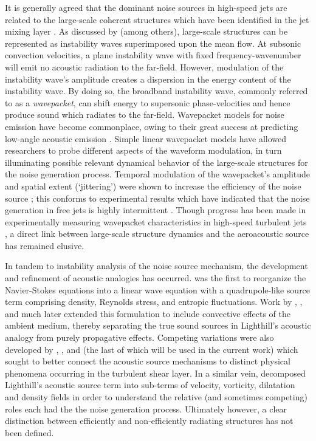 It is generally agreed that the dominant noise sources in high-speed jets are related to the large-scale coherent structures which have been identified in the jet mixing layer \citep{Arndt1997}. 
As discussed by \citet{Tam1995} (among others), large-scale structures can be represented as instability waves superimposed upon the mean flow.
At subsonic convection velocities, a plane instability wave with fixed frequency-wavenumber will emit no acoustic radiation to the far-field.
However, modulation of the instability wave's amplitude creates a dispersion in the energy content of the instability wave.
By doing so, the broadband instability wave, commonly referred to as a \emph{wavepacket}, can shift energy to supersonic phase-velocities and hence produce sound which radiates to the far-field.
Wavepacket models for noise emission have become commonplace, owing to their great success at predicting low-angle acoustic emission \citep{Obrist2011}.
Simple linear wavepacket models have allowed researchers to probe different aspects of the waveform modulation, in turn illuminating possible relevant dynamical behavior of the large-scale structures for the noise generation process.
Temporal modulation of the wavepacket's amplitude and spatial extent (`jittering') were shown to increase the efficiency of the noise source \citep{Cavalieri2010}; this conforms to experimental results which have indicated that the noise generation in free jets is highly intermittent \citep{Hileman2005,Kearney-Fischer2013}. 
Though progress has been made in experimentally measuring wavepacket characteristics in high-speed turbulent jets \citep{Cavalieri2013,Baqui2014}, a direct link between large-scale structure dynamics and the aeroacoustic source has remained elusive.

In tandem to instability analysis of the noise source mechanism, the development and refinement of acoustic analogies has occurred. 
\citet{Lighthill1952} was the first to reorganize the Navier-Stokes equations into a linear wave equation with a quadrupole-like source term comprising density, Reynolds stress, and entropic fluctuations.
Work by \citet{Phillips1960}, \citet{Lilley1974}, and much later \citet{Goldstein2003} extended this formulation to include convective effects of the ambient medium, thereby separating the true sound sources in Lighthill's acoustic analogy from purely propagative effects.
Competing variations were also developed by \citet{Powell1964}, \citet{Howe1975}, and \citet{Ribner1962} (the last of which will be used in the current work) which sought to better connect the acoustic source mechanisms to distinct physical phenomena occurring in the turbulent shear layer.
In a similar vein, \citet{Cabana2008} decomposed Lighthill's acoustic source term into sub-terms of velocity, vorticity, dilatation and density fields in order to understand the relative (and sometimes competing) roles each had the the noise generation process.
Ultimately however, a clear distinction between efficiently and non-efficiently radiating structures has not been defined.

